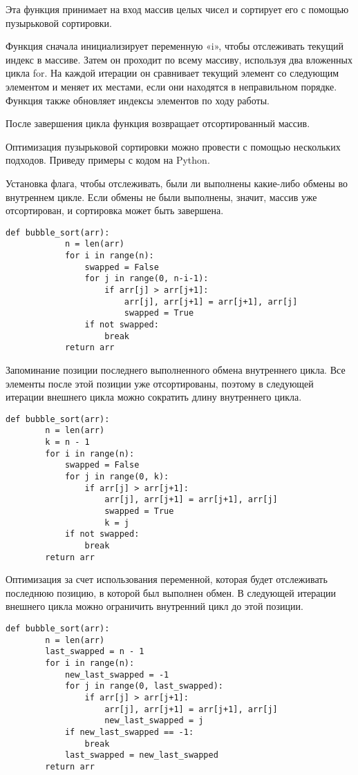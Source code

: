\documentclass[oneside,14pt]{extarticle} %
\begin{document}
	Эта функция принимает на вход массив целых чисел и сортирует его с помощью пузырьковой сортировки.
		
	Функция сначала инициализирует переменную «i», чтобы отслеживать текущий индекс в массиве. Затем он проходит по всему массиву, используя два вложенных цикла for. На каждой итерации он сравнивает текущий элемент со следующим элементом и меняет их местами, если они находятся в неправильном порядке. Функция также обновляет индексы элементов по ходу работы.
		
	После завершения цикла функция возвращает отсортированный массив.
	
	Оптимизация пузырьковой сортировки можно провести с помощью нескольких подходов. Приведу примеры с кодом на Python.
	
	Установка флага, чтобы отслеживать, были ли выполнены какие-либо обмены во внутреннем цикле. Если обмены не были выполнены, значит, массив уже отсортирован, и сортировка может быть завершена.
	
	\begin{lstlisting}[caption={Алгоритм рекурсивной пузырьковой сортировки}]
		def bubble_sort(arr):
			n = len(arr)
			for i in range(n):
				swapped = False
				for j in range(0, n-i-1):
					if arr[j] > arr[j+1]:
						arr[j], arr[j+1] = arr[j+1], arr[j]
						swapped = True
				if not swapped:
					break
			return arr
	\end{lstlisting}
	
	
	Запоминание позиции последнего выполненного обмена внутреннего цикла. Все элементы после этой позиции уже отсортированы, поэтому в следующей итерации внешнего цикла можно сократить длину внутреннего цикла.
	
	\begin{lstlisting}[caption={Алгоритм рекурсивной пузырьковой сортировки}]
	def bubble_sort(arr):
		n = len(arr)
		k = n - 1
		for i in range(n):
			swapped = False
			for j in range(0, k):
				if arr[j] > arr[j+1]:
					arr[j], arr[j+1] = arr[j+1], arr[j]
					swapped = True
					k = j
			if not swapped:
				break
		return arr
	\end{lstlisting}
	
	Оптимизация за счет использования переменной, которая будет отслеживать последнюю позицию, в которой был выполнен обмен. В следующей итерации внешнего цикла можно ограничить внутренний цикл до этой позиции.
	
	\begin{lstlisting}[caption={Алгоритм рекурсивной пузырьковой сортировки}]
	def bubble_sort(arr):
		n = len(arr)
		last_swapped = n - 1
		for i in range(n):
			new_last_swapped = -1
			for j in range(0, last_swapped):
				if arr[j] > arr[j+1]:
					arr[j], arr[j+1] = arr[j+1], arr[j]
					new_last_swapped = j
			if new_last_swapped == -1:
				break
			last_swapped = new_last_swapped
		return arr
	\end{lstlisting}
	
\end{document}
